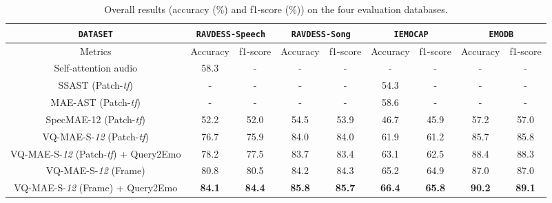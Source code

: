 \documentclass{article}
\begin{document}
\begin{table*}[t]
\centering
\caption{Overall results (accuracy (\%) and f1-score (\%)) on the four evaluation databases.}
\label{tab:my-table}
\begin{tabular}{c|cc|cc|cc|cc}
\texttt{DATASET} & \multicolumn{2}{c|}{\texttt{RAVDESS-Speech}} & \multicolumn{2}{c|}{\texttt{RAVDESS-Song}} & \multicolumn{2}{c|}{\texttt{IEMOCAP}} & \multicolumn{2}{c}{\texttt{EMODB}} \\ \hline
Metrics & Accuracy           & f1-score          & Accuracy          & f1-score         & Accuracy           & f1-score           & Accuracy          & f1-score          \\ \hline
Self-attention audio \cite{chumachenko2022self}        & 58.3               &   -          & -              &     -       &      -         &      -        &        -      &          -     \\
SSAST \cite{gong2022ssast} (Patch-\emph{tf})        &  -      &   -          & -              &     -       &      54.3         &      -        &        -      &          -     \\
MAE-AST \cite{baade2022mae} (Patch-\emph{tf}) &  -      &   -          & -              &     -       &      58.6         &      -        &        -      &          - \\
SpecMAE-12 (Patch-\emph{tf})        &  52.2      &   52.0          & 54.5              &     53.9       &      46.7         &      45.9        &        57.2      & 57.0    \\ \hline
VQ-MAE-S-\emph{12}  (Patch-\emph{tf})      &   76.7             &      75.9       &        84.0     &    84.0        &    61.9           &   61.2           &    85.7          &      85.8       \\
VQ-MAE-S-\emph{12} (Patch-\emph{tf}) + Query2Emo        & 78.2               &   77.5          &       83.7       &      83.4      &    63.1           &   62.5           &      88.4        &  88.3           \\
VQ-MAE-S-\emph{12} (Frame)       & 80.8               &   80.5          &       84.2       &      84.3      &    65.2           &   64.9           &      87.0        &  87.0       \\  
VQ-MAE-S-\emph{12} (Frame) + Query2Emo      & \textbf{84.1}               &   \textbf{84.4}          &       \textbf{85.8}       &      \textbf{85.7}      &    \textbf{66.4}           &   \textbf{65.8}           &      \textbf{90.2}        &  \textbf{89.1}          
        
\end{tabular}
\end{table*}
\end{document}
